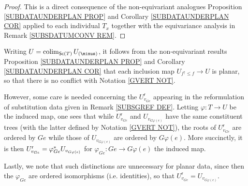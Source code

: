 \documentclass[a4paper,10pt]{article}%
\begin{document}
\begin{proof}
	This is a direct consequence of the 
	non-equivariant analogues Proposition \ref{SUBDATAUNDERPLAN PROP} and Corollary \ref{SUBDATAUNDERPLAN COR}
	applied to each individual $T_x$ together with the equivariance analysis in
	Remark \ref{SUBSDATUMCONV REM}.
\end{proof}


\begin{remark} \label{WHYR REM}
Writing $U = \colim_{\mathsf{Sc}(T)}U_{(\minus)}$, 
it follows from the non-equivariant results
Proposition \ref{SUBDATAUNDERPLAN PROP} and
Corollary \ref{SUBDATAUNDERPLAN COR}
that each inclusion map $U_{f^{\uparrow} \leq f} \to U$
is planar, so that there is no conflict with 
Notation \ref{GVERT NOT}.

However, some care is needed concerning the
$U_{v_{Ge}}^{\mathsf{r}}$ appearing in the reformulation of substitution data given in Remark \ref{SUBSGREF DEF}.
Letting $\varphi \colon T \to U$ be the induced map,
one sees that while $U_{v_{Ge}}^{\mathsf{r}}$ and 
$U_{v_{G\varphi(e)}}$
have the same constituent trees (with the latter defined by Notation \ref{GVERT NOT}),
the roots of $U_{v_{Ge}}^{\mathsf{r}}$ are ordered by $Ge$
while those of $U_{v_{G\varphi(e)}}$ are ordered by $G \varphi(e)$.
More succinctly, it is then 
$U_{v_{Ge}}^{\mathsf{r}} = \varphi_{Ge}^{\**}U_{v_{G\varphi(e)}}$ for $\varphi_{Ge} \colon Ge \to G \varphi(e)$
the induced map.

Lastly, we note that such distinctions are unnecessary for planar data, since then the $\varphi_{G e}$ are ordered isomorphisms (i.e. identities), so that 
$U_{v_{Ge}}^{\mathsf{r}} = U_{v_{G\varphi(e)}}$.
\end{remark}
\end{document}

